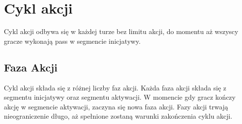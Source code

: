 

\section{Cykl akcji}
Cykl akcji odbywa się w każdej turze bez limitu akcji, do momentu aż wszyscy gracze wykonają pass w segmencie inicjatywy.


\subsection{Faza Akcji}
Cykl akcji składa się z różnej liczby faz akcji. Każda faza akcji składa się z segmentu inicjatywy oraz segmentu aktywacji. W momencie gdy gracz kończy akcję w segmencie aktywacji, zaczyna się nowa faza akcji. Fazy akcji trwają nieograniczenie długo, aż spełnione zostaną warunki zakończenia cyklu akcji.
